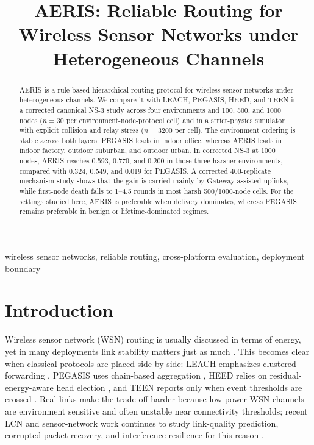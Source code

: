 \documentclass[letterpaper,conference]{IEEEtran}
\title{AERIS: Reliable Routing for Wireless Sensor Networks under Heterogeneous Channels}
\author{
\IEEEauthorblockN{Kangrui Li, Junyi Lin, and Xiaobo Zhang}
\IEEEauthorblockA{
Faculty of Automation, Guangdong University of Technology \\
Guangzhou 510006, China \\
\textit{Corresponding author:} Kangrui Li \\
\texttt{1403073295@mails.gdut.edu.cn}
}
}
\begin{document}
\maketitle

\begin{abstract}
AERIS is a rule-based hierarchical routing protocol for wireless sensor networks under heterogeneous channels. We compare it with LEACH, PEGASIS, HEED, and TEEN in a corrected canonical NS-3 study across four environments and 100, 500, and 1000 nodes ($n=30$ per environment-node-protocol cell) and in a strict-physics simulator with explicit collision and relay stress ($n=3200$ per cell). The environment ordering is stable across both layers: PEGASIS leads in indoor office, whereas AERIS leads in indoor factory, outdoor suburban, and outdoor urban. In corrected NS-3 at 1000 nodes, AERIS reaches 0.593, 0.770, and 0.200 in those three harsher environments, compared with 0.324, 0.549, and 0.019 for PEGASIS. A corrected 400-replicate mechanism study shows that the gain is carried mainly by Gateway-assisted uplinks, while first-node death falls to 1--4.5 rounds in most harsh 500/1000-node cells. For the settings studied here, AERIS is preferable when delivery dominates, whereas PEGASIS remains preferable in benign or lifetime-dominated regimes.
\end{abstract}

\begin{IEEEkeywords}
wireless sensor networks, reliable routing, cross-platform evaluation, deployment boundary
\end{IEEEkeywords}

\section{Introduction}
Wireless sensor network (WSN) routing is usually discussed in terms of energy, yet in many deployments link stability matters just as much \cite{tossa2025wireless,thakur2025ai-driven,almutairi2024survey}. This becomes clear when classical protocols are placed side by side: LEACH emphasizes clustered forwarding \cite{heinzelman2000leach}, PEGASIS uses chain-based aggregation \cite{lindsey2002pegasis}, HEED relies on residual-energy-aware head election \cite{younis2004heed}, and TEEN reports only when event thresholds are crossed \cite{manjeshwar2001teen}. Real links make the trade-off harder because low-power WSN channels are environment sensitive and often unstable near connectivity thresholds; recent LCN and sensor-network work continues to study link-quality prediction, corrupted-packet recovery, and interference resilience for this reason \cite{chatharajupalli2025probing,szafranski2025cec,xu2025sloraplus}.
\end{document}

